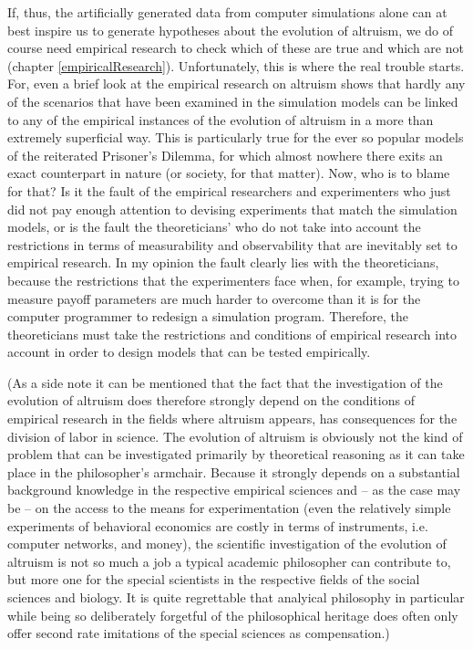 If, thus, the artificially generated data from computer simulations alone can at
best inspire us to generate hypotheses about the evolution of altruism, we do
of course need empirical research to check which of these are true and which
are not (chapter \ref{empiricalResearch}). Unfortunately, this is where the
real trouble starts. For, even a brief look at the empirical research on
altruism shows that hardly any of the scenarios that have been examined in the
simulation models can be linked to any of the empirical instances of the
evolution of altruism in a more than extremely superficial way. This is
particularly true for the ever so popular models of the reiterated Prisoner's
Dilemma, for which almost nowhere there exits an exact counterpart in nature (or
society, for that matter). Now, who is to blame for that? Is it the fault of
the empirical researchers and experimenters who just did not pay enough
attention to devising experiments that match the simulation models, or is the
fault the theoreticians' who do not take into account the restrictions in
terms of measurability and observability that are inevitably set to
empirical research. In my opinion the fault clearly lies with the
theoreticians, because the restrictions that the experimenters face when, for
example, trying to measure payoff parameters are much harder to overcome than
it is for the computer programmer to redesign a simulation program. Therefore,
the theoreticians must take the restrictions and conditions of empirical
research into account in order to design models that can be tested empirically.

(As a side note it can be mentioned that the fact that the investigation of
the evolution of altruism does therefore strongly depend on the conditions of
empirical research in the fields where altruism appears, has consequences for
the division of labor in science. The evolution of altruism is obviously not the
kind of problem that can be investigated primarily by theoretical reasoning as
it can take place in the philosopher's armchair.  Because it strongly depends
on a substantial background knowledge in the respective empirical sciences and
-- as the case may be -- on the access to the means for experimentation (even
the relatively simple experiments of behavioral economics are costly in terms
of instruments, i.e. computer networks, and money), the scientific investigation of
the evolution of altruism is not so much a job a typical academic philosopher
can contribute to, but more one for the special scientists in the respective
fields of the social sciences and biology. It is quite regrettable that analyical philosophy in particular while being so deliberately forgetful of the philosophical heritage does often only offer second rate imitations of the special sciences as compensation.)

